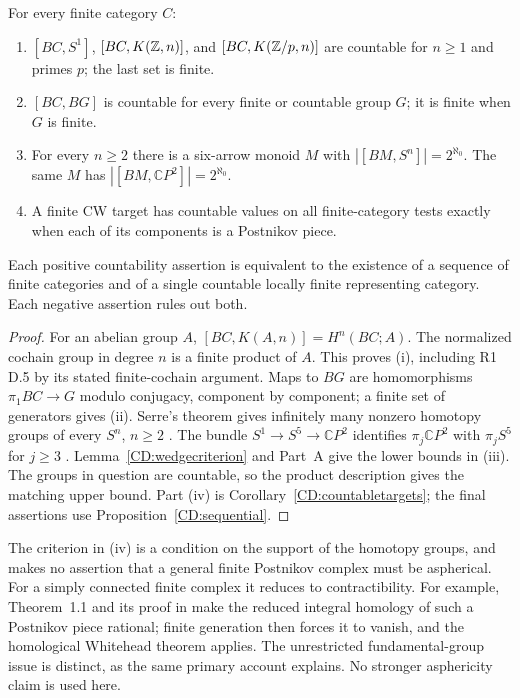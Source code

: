 \begin{corollary}
\label{CD:targetlist}
For every finite category $C$:
\begin{enumerate}[label=(\roman*)]
\item $[BC,S^1]$, $[BC,K(\mathbb Z,n)]$, and $[BC,K(\mathbb Z/p,n)]$ are
countable for $n\ge1$ and primes $p$; the last set is finite.
\item $[BC,BG]$ is countable for every finite or countable group $G$;
it is finite when $G$ is finite.
\item For every $n\ge2$ there is a six-arrow monoid $M$ with
$|[BM,S^n]|=2^{\aleph_0}$.  The same $M$ has
$|[BM,\mathbb CP^2]|=2^{\aleph_0}$.
\item A finite CW target has countable values on all finite-category
tests exactly when each of its components is a Postnikov piece.
\end{enumerate}
Each positive countability assertion is equivalent to the existence of
a sequence of finite categories and of a single countable locally finite
representing category.  Each negative assertion rules out both.
\end{corollary}
\begin{proof}
For an abelian group $A$, $[BC,K(A,n)]=H^n(BC;A)$.
The normalized cochain group in degree $n$ is a finite product of $A$.
This proves (i), including R1 D.5 by its stated finite-cochain argument.
Maps to $BG$ are homomorphisms $\pi_1BC\to G$ modulo conjugacy,
component by component; a finite set of generators gives (ii).
Serre's theorem gives infinitely many nonzero homotopy groups of every
$S^n$, $n\ge2$ \cite[\S3, Th\'eor\`eme 10 and its corollary,
pp.~217--219]{CDSerre1953}.  The bundle
$S^1\to S^5\to\mathbb CP^2$ identifies
$\pi_j\mathbb CP^2$ with $\pi_jS^5$ for $j\ge3$
\cite[Example~4.45]{CDHatcher2002}.  Lemma~\ref{CD:wedgecriterion}
and Part~A give the lower bounds in (iii).  The groups in question are
countable, so the product description gives the matching upper bound.
Part (iv) is Corollary~\ref{CD:countabletargets}; the final assertions
use Proposition~\ref{CD:sequential}.
\end{proof}

The criterion in (iv) is a condition on the support of the homotopy
groups, and makes no assertion that a general finite Postnikov complex
must be aspherical.  For a simply connected finite complex it reduces
to contractibility.  For example, Theorem~1.1 and its proof in
\cite{CDCasacuberta1998} make the reduced integral homology of such a
Postnikov piece rational; finite generation then forces it to vanish,
and the homological Whitehead theorem applies.  The unrestricted
fundamental-group issue is distinct, as the same primary account
explains.  No stronger asphericity claim is used here.

